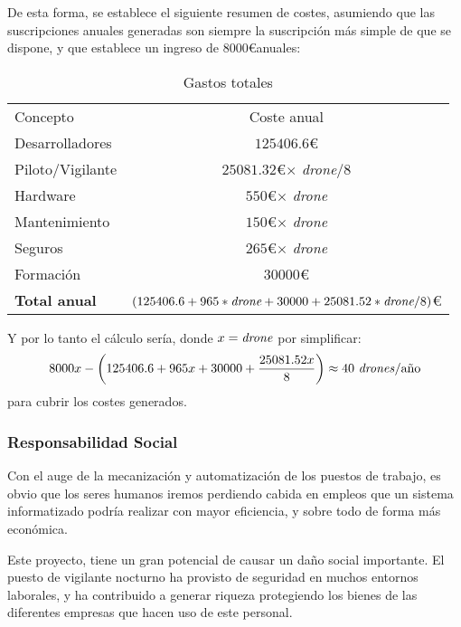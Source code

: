 De esta forma, se establece el siguiente resumen de costes, asumiendo que las suscripciones anuales generadas son siempre la suscripción más simple de que se dispone, y que establece un ingreso de $8000$\euro anuales: 

\begin{table}[H]
	\begin{center}
		\begin{tabular}{l  c}\hline
			\toprule
			Concepto & Coste anual\\
			\otoprule
			Desarrolladores & $125406.6$\euro\\
			Piloto/Vigilante & $25081.32$\euro $\times$ \emph{drone}/8 \\ 
			Hardware   & $550$\euro $\times$ \emph{drone}\\
			Mantenimiento & $150$\euro $\times$ \emph{drone}\\
			Seguros & $265$\euro $\times$ \emph{drone}\\
			Formación & $30000$\euro \\
			\hline
			\textbf{Total anual} & $(125406.6 + 965*\emph{drone} + 30000 + 25081.52*\emph{drone}/8) $\euro\\
			\bottomrule
		\end{tabular}
		\caption{Gastos totales}
		\label{tb:gastosTotalesEq}
	\end{center}
\end{table}

Y por lo tanto el cálculo sería, donde $x=\text{\emph{drone}}$ por simplificar: 
\begin{equation}
8000x - \left(125406.6 + 965x + 30000 + \frac{25081.52x}{8}\right) \approx 40 \text{ \emph{drones}/año}
\end{equation}
 para cubrir los costes generados.


\subsubsection{Responsabilidad Social}
\label{subsec:respSocial}
Con el auge de la mecanización y automatización de los puestos de trabajo, es obvio que los seres humanos iremos perdiendo cabida en empleos que un sistema informatizado podría realizar con mayor eficiencia, y sobre todo de forma más económica. 

Este proyecto, tiene un gran potencial de causar un daño social importante. El puesto de vigilante nocturno ha provisto de seguridad en muchos entornos laborales, y ha contribuido a generar riqueza protegiendo los bienes de las diferentes empresas que hacen uso de este personal.


